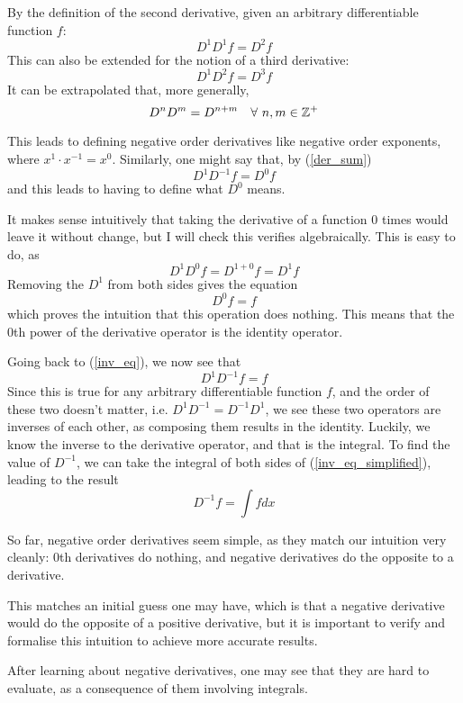 \documentclass{article}
\def\squad{\hskip2\fontdimen3\font}
\begin{document}
By the definition of the second derivative, given an arbitrary differentiable
function $f$: $$D^1D^1 f = D^2 f$$ This can also be extended for the notion of
a third derivative: $$D^1D^2 f = D^3 f$$ It can be extrapolated that, more
generally,
\begin{equation}
	\label{der_sum}
	D^nD^m = D^{n+m} \quad \forall \squad n,m \in \mathbb{Z}^{+}
\end{equation}

This leads to defining negative order derivatives like negative order
exponents, where $x^1 \cdot x^{-1}= x^0$. Similarly, one might say that, by (\ref{der_sum})
\begin{equation}
	\label{inv_eq}
	D^1D^{-1} f = D^0 f
\end{equation}
and this leads to having to define what $D^0$ means.

It makes sense intuitively that taking the derivative of a function 0 times
would leave it without change, but I will check this verifies
algebraically. This is easy to do, as $$D^1 D^0 f = D^{1+0} f = D^1 f$$
Removing the $D^1$ from both sides gives the equation $$D^0 f = f$$ which
proves the intuition that this operation does nothing. This means that the 0th
power of the derivative operator is the identity operator.

Going back to (\ref{inv_eq}), we now see that
\begin{equation}
	\label{inv_eq_simplified}
	D^1D^{-1} f = f
\end{equation}
Since this is true for any arbitrary differentiable function $f$, and the order
of these two doesn't matter, i.e. $D^1D^{-1}=D^{-1}D^1$, we see these two
operators are inverses of each other, as composing them results in the
identity. Luckily, we know the inverse to the derivative operator, and that is
the integral. To find the value of $D^{-1}$, we can take the integral of both
sides of (\ref{inv_eq_simplified}), leading to the result
$$
D^{-1} f = \int f dx
$$

So far, negative order derivatives seem simple, as they match our intuition very cleanly:
0th derivatives do nothing, and negative derivatives do the opposite to a derivative.

This matches an initial guess one may have, which is that a negative derivative
would do the opposite of a positive derivative, but it is important to verify
and formalise this intuition to achieve more accurate results.

After learning about negative derivatives, one may see that they are hard to
evaluate, as a consequence of them involving integrals.
\end{document}
